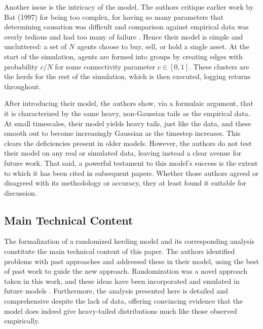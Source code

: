 \documentclass{article}
\begin{document}
Another issue is the intricacy of the model.
The authors critique earlier work by Bat (1997) for being too complex, for having so many parameters that determining causation was difficult and comparison against empirical data was overly tedious and had too many of failure \cite{cont}.
Hence their model is simple and uncluttered: a set of $N$ agents choose to buy, sell, or hold a single asset.
At the start of the simulation, agents are formed into groups by creating edges with probability $c/N$ for some connectivity parameter $c \in [0,1]$.
These clusters are the herds for the rest of the simulation, which is then executed, logging returns throughout.

After introducing their model, the authors show, via a formulaic argument, that it is characterized by the same heavy, non-Gaussian tails as the empirical data. 
At small timescales, their model yields heavy tails, just like the data, and these smooth out to become increasingly Gaussian as the timestep increases.
This clears the deficiencies present in older models. 
However, the authors do not test their model on any real or simulated data, leaving instead a clear avenue for future work.
That said, a powerful testament to this model's success is the extent to which it has been cited in subsequent papers.
Whether those authors agreed or disagreed with its methodology or accuracy, they at least found it suitable for discussion.

\subsection{Main Technical Content}
The formalization of a randomized herding model and its corresponding analysis constitute the main technical content of this paper.
The authors identified problems with past approaches and addressed these in their model, using the best of past work to guide the new approach.
Randomization was a novel approach taken in this work, and these ideas have been incorporated and emulated in future models \cite{lin}.
Furthermore, the analysis presented here is detailed and comprehensive despite the lack of data, offering convincing evidence that the model does indeed give heavy-tailed distributions much like those observed empirically.
\end{document}
